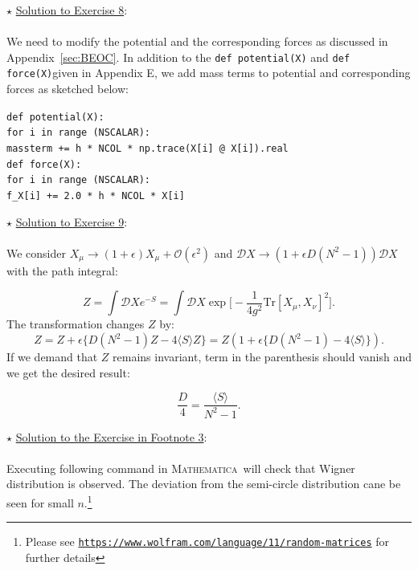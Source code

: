 \documentclass[letter,11pt]{article}
\newcommand{\MA}{\textsc{Mathematica}}
\newcommand\tab[1][1cm]{\hspace*{#1}}
\begin{document}
\noindent $\star$ \ul{Solution to Exercise 8}:
\\  \\ 
We need to modify the potential and the corresponding forces as discussed in Appendix~\ref{sec:BEOC}. In addition to the \verb"def potential(X)" 
and \verb"def force(X)"given in Appendix E, we add mass terms to potential and corresponding forces as sketched below: 

\begin{footnotesize} 

\begin{mdframed}[backgroundcolor=blue!3] 
 \verb"def potential(X):" \\
 \tab	\verb"for i in range (NSCALAR):" \\ 
    \tab     \tab	\verb"massterm += h * NCOL * np.trace(X[i] @ X[i]).real" \\
    
\vspace{5mm} 
\noindent
\verb"def force(X):" \\ 
\tab	\verb"for i in range (NSCALAR):"  \\ 
       \tab  \tab 	\verb"f_X[i] += 2.0 * h * NCOL * X[i] " 
\end{mdframed}
\end{footnotesize} 

\noindent $\star$ \ul{Solution to Exercise 9}:
\\ \\ 
We consider $ X_{\mu} \to (1 + \epsilon) X_{\mu} + \mathcal{O}(\epsilon^2)$
and $\mathcal{D}X \to (1 + \epsilon D (N^2-1))\mathcal{D}X$ with the path integral:

\begin{equation}
	Z = \int \mathcal{D}X e^{-S} = \int \mathcal{D}X \exp\Big[-\frac{1}{4g^2} \mbox{Tr} [X_\mu,X_\nu]^2\Big].
\end{equation}
The transformation changes $Z$ by:
\begin{equation}
	Z = Z + \epsilon \Big\{ D(N^2 -1)Z - 4\langle S \rangle Z  \Big\} = Z ( 1 + \epsilon \Big\{ D(N^2 -1) - 4\langle S \rangle   \Big\}).
\end{equation}
If we demand that $Z$ remains invariant, term in the parenthesis should vanish and we get the desired result:

\begin{equation}
	\frac{D}{4} = \frac{\langle S \rangle}{N^2 - 1}. 
\end{equation}  
      
\vspace{3mm}     
\noindent $\star$ \ul{Solution to the Exercise in Footnote 3}:
\\  \\
Executing following command in \MA~will check that Wigner distribution is 
observed. The deviation from the semi-circle distribution cane be seen for small 
$n$.\footnote{Please see \texttt{\href{https://www.wolfram.com/language/11/random-matrices}{https://www.wolfram.com/language/11/random-matrices}} for further details}
\end{document}
